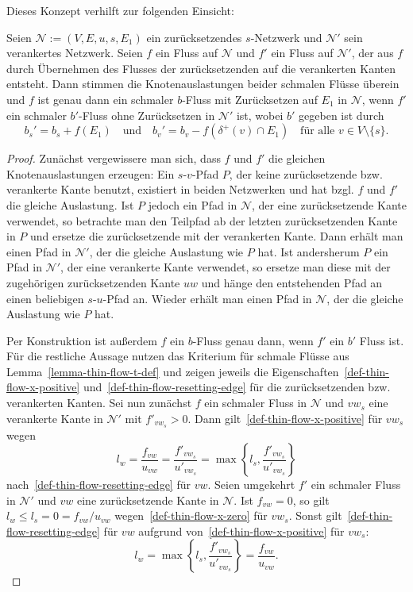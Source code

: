 Dieses Konzept verhilft zur folgenden Einsicht:
\begin{lemma}\label{lemma-thin-flows-anchored-networks}
	Seien $\mathcal{N}:= (V, E, u, s, E_1)$ ein zurücksetzendes $s$-Netzwerk und $\mathcal{N}'$ sein verankertes Netzwerk.
	Seien $f$ ein Fluss auf $\mathcal{N}$ und $f'$ ein Fluss auf $\mathcal{N}'$, der aus $f$ durch Übernehmen des Flusses der zurücksetzenden auf die verankerten Kanten entsteht.
	Dann stimmen die Knotenauslastungen beider schmalen Flüsse überein und
	$f$ ist genau dann ein schmaler $b$-Fluss mit Zurücksetzen auf $E_1$ in $\mathcal{N}$, wenn $f'$ ein schmaler $b'$-Fluss ohne Zurücksetzen in $\mathcal{N}'$ ist, wobei $b'$ gegeben ist durch
	\[
		b_s' = b_s + f(E_1) \text{~~ und ~~} b_v' = b_v - f(\delta^+(v)\cap E_1) \text{~~ für alle $v\in V\setminus \{s \}$}.
	\]
\end{lemma}
\begin{proof}
	Zunächst vergewissere man sich, dass $f$ und $f'$ die gleichen Knotenauslastungen erzeugen:
	Ein $s$-$v$-Pfad $P$, der keine zurücksetzende bzw. verankerte Kante benutzt, existiert in beiden Netzwerken und hat bzgl. $f$ und $f'$ die gleiche Auslastung.
	Ist $P$ jedoch ein Pfad in $\mathcal{N}$, der eine zurücksetzende Kante verwendet, so betrachte man den Teilpfad ab der letzten zurücksetzenden Kante in $P$ und ersetze die zurücksetzende mit der verankerten Kante.
	Dann erhält man einen Pfad in $\mathcal{N}'$, der die gleiche Auslastung wie $P$ hat.
	Ist andersherum $P$ ein Pfad in $\mathcal{N}'$, der eine verankerte Kante verwendet, so ersetze man diese mit der zugehörigen zurücksetzenden Kante $uw$ und hänge den entstehenden Pfad an einen beliebigen $s$-$u$-Pfad an.
	Wieder erhält man einen Pfad in $\mathcal{N}$, der die gleiche Auslastung wie $P$ hat.
	
	Per Konstruktion ist außerdem $f$ ein $b$-Fluss genau dann, wenn $f'$ ein $b'$ Fluss ist.
	Für die restliche Aussage nutzen das Kriterium für schmale Flüsse aus Lemma~\ref{lemma-thin-flow-t-def} und zeigen jeweils die Eigenschaften~\ref{def-thin-flow-x-positive} und~\ref{def-thin-flow-resetting-edge} für die zurücksetzenden bzw. verankerten Kanten.
	Sei nun zunächst $f$ ein schmaler Fluss in $\mathcal{N}$ und $vw_s$ eine verankerte Kante in $\mathcal{N'}$ mit $f'_{vw_s} > 0$.
	Dann gilt~\ref{def-thin-flow-x-positive} für $vw_s$ wegen
	\[ l_w = \frac{f_{vw}}{u_{vw}} = \frac{f'_{vw_s}}{u'_{vw_s}} = \max\left\{ l_s, \frac{f'_{vw_s}}{u'_{vw_s}} \right\} \]
	nach~\ref{def-thin-flow-resetting-edge} für $vw$.
	Seien umgekehrt $f'$ ein schmaler Fluss in $\mathcal{N}'$ und $vw$ eine zurück\-setzende Kante in $\mathcal{N}$.
	Ist $f_{vw} = 0$, so gilt $l_w \leq l_s = 0 = f_{vw}/u_{vw}$ wegen~\ref{def-thin-flow-x-zero} für $vw_s$.
	Sonst gilt~\ref{def-thin-flow-resetting-edge} für $vw$ aufgrund von~\ref{def-thin-flow-x-positive} für $vw_s$:
	\[
		l_w = \max\left\{ l_s, \frac{f'_{vw_s}}{u'_{vw_s}} \right\} = \frac{f_{vw}}{u_{vw}}.
	\]
\end{proof}

